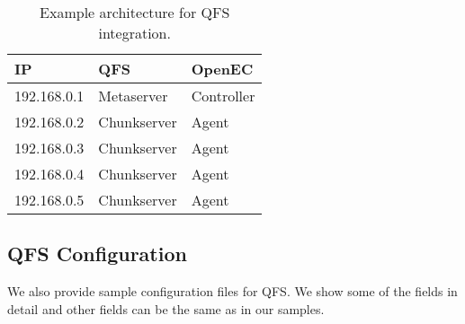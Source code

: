 \documentclass[letterpaper,12pt]{article}
\begin{document}
\begin{table}[h]
\centering
\footnotesize
\renewcommand{\arraystretch}{1.1}
\begin{tabular}{|l|l|l|}
\hline
IP & QFS & OpenEC \\
\hline
\hline
192.168.0.1 & Metaserver & Controller \\
\hline
192.168.0.2 & Chunkserver & Agent \\
\hline
192.168.0.3 & Chunkserver & Agent \\
\hline
192.168.0.4 & Chunkserver & Agent \\
\hline
192.168.0.5 & Chunkserver & Agent \\
\hline
\end{tabular}
\vspace{-3pt}
\caption{Example architecture for QFS integration.}
\label{tab:qfsarch}
\end{table}

\subsection{QFS Configuration}

We also provide sample configuration files for QFS. We show some of the fields
in detail and other fields can be the same as in our samples. 
\end{document}
